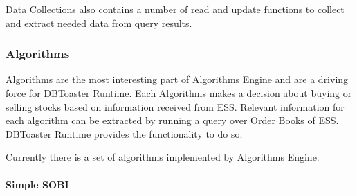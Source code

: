 \documentclass[14pt]{article}
\begin{document}
Data Collections also contains a number of read and update functions to collect and extract needed data from query results.






\subsubsection{Algorithms}

Algorithms are the most interesting part of Algorithms Engine and are a driving force for DBToaster Runtime. Each Algorithms makes a decision about buying or selling stocks based on information received from ESS. Relevant information for each algorithm can be extracted by running a query over Order Books of ESS. DBToaster Runtime provides the functionality to do so. 

Currently there is a set of algorithms implemented by Algorithms Engine. 

\paragraph{Simple SOBI}
\end{document}
